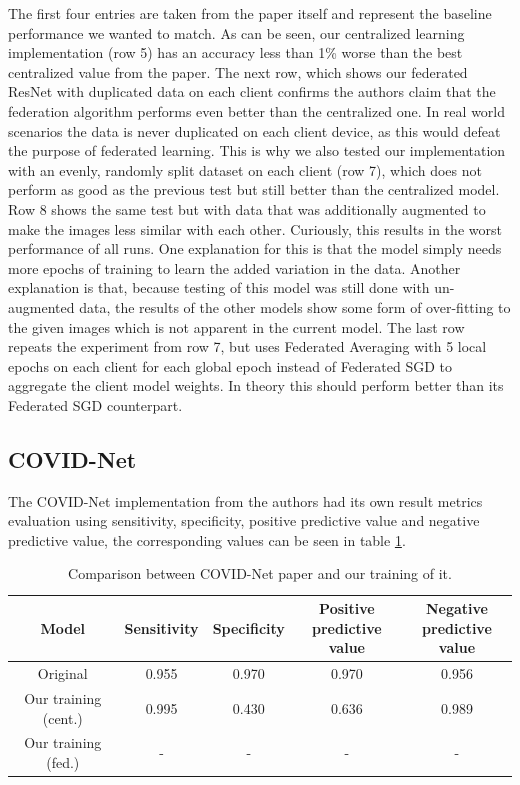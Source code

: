 The first four entries are taken from the paper itself and represent the baseline performance we wanted to match. As can be seen, our centralized learning implementation (row 5) has an accuracy less than 1\% worse than the best centralized value from the paper. 
The next row, which shows our federated ResNet with duplicated data on each client confirms the authors claim that the federation algorithm performs even better than the centralized one.
In real world scenarios the data is never duplicated on each client device, as this would defeat the purpose of federated learning.
This is why we also tested our implementation with an evenly, randomly split dataset on each client (row 7), which does not perform as good as the previous test but still better than the centralized model.
Row 8 shows the same test but with data that was additionally augmented to make the images less similar with each other. Curiously, this results in the worst performance of all runs. One explanation for this is that the model simply needs more epochs of training to learn the added variation in the data. Another explanation is that, because testing of this model was still done with un-augmented data, the results of the other models show some form of over-fitting to the given images which is not apparent in the current model.
The last row repeats the experiment from row 7, but uses Federated Averaging with 5 local epochs on each client for each global epoch instead of Federated SGD to aggregate the client model weights. In theory this should perform better than its Federated SGD counterpart.

\subsection{COVID-Net}
The COVID-Net implementation from the authors had its own result metrics evaluation using sensitivity, specificity, positive predictive value and negative predictive value, the corresponding values can be seen in table \ref{tab:results_covidnet}. 

\begin{table}[htbp]
    \captionsetup[table]{justification=centering}
    \small
    \centering
    \caption{Comparison between COVID-Net paper\cite{covid_net} and our training of it.}
    \begin{tabular}{c|c|c|c|c}
        Model & Sensitivity & Specificity & \shortstack[c]{Positive\\predictive value}  & \shortstack[c]{Negative\\predictive value}\\
        \hline
        Original & 0.955 & 0.970 & 0.970 & 0.956 \\
        Our training (cent.) & 0.995 & 0.430 & 0.636 & 0.989 \\
        Our training (fed.) & - & - & - & -\\
    \end{tabular}
    \label{tab:results_covidnet}
\end{table}


